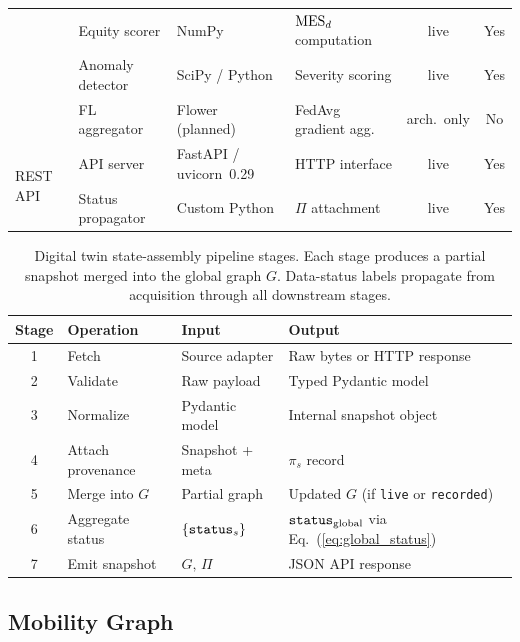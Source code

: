 \begin{table}[t]
\begin{tabular}{@{}llllcc@{}}
  & Equity scorer               & NumPy               & $\mathrm{MES}_d$ computation & live             & Yes \\
  & Anomaly detector            & SciPy / Python      & Severity scoring    & live              & Yes \\
  & FL aggregator               & Flower (planned)    & FedAvg gradient agg.& arch.\ only       & No  \\
\midrule
\multirow{2}{*}{REST API}
  & API server                  & FastAPI / uvicorn~0.29 & HTTP interface  & live              & Yes \\
  & Status propagator           & Custom Python       & $\Pi$ attachment    & live              & Yes \\
\bottomrule
\end{tabular}
\end{table}

\begin{table}[t]
\caption{Digital twin state-assembly pipeline stages. Each stage produces a
         partial snapshot merged into the global graph $G$.
         Data-status labels propagate from acquisition through all
         downstream stages.}
\label{tab:pipeline}
\centering
\renewcommand{\arraystretch}{1.20}
\begin{tabular}{@{}clll@{}}
\toprule
\textbf{Stage} & \textbf{Operation} & \textbf{Input} & \textbf{Output} \\
\midrule
1 & Fetch            & Source adapter  & Raw bytes or HTTP response \\
2 & Validate         & Raw payload     & Typed Pydantic model \\
3 & Normalize        & Pydantic model  & Internal snapshot object \\
4 & Attach provenance& Snapshot + meta & $\pi_s$ record \\
5 & Merge into $G$   & Partial graph   & Updated $G$ (if \texttt{live} or \texttt{recorded}) \\
6 & Aggregate status & $\{\mathtt{status}_s\}$     & $\mathtt{status}_{\mathrm{global}}$ via Eq.~(\ref{eq:global_status}) \\
7 & Emit snapshot    & $G,\,\Pi$       & JSON API response \\
\bottomrule
\end{tabular}
\end{table}

\subsection{Mobility Graph}

